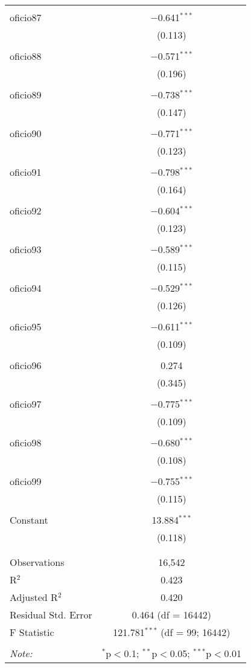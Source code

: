 \begin{table}[!htbp]
\begin{tabular}{@{\extracolsep{5pt}}lc}
  & \\ 
 oficio87 & $-$0.641$^{***}$ \\ 
  & (0.113) \\ 
  & \\ 
 oficio88 & $-$0.571$^{***}$ \\ 
  & (0.196) \\ 
  & \\ 
 oficio89 & $-$0.738$^{***}$ \\ 
  & (0.147) \\ 
  & \\ 
 oficio90 & $-$0.771$^{***}$ \\ 
  & (0.123) \\ 
  & \\ 
 oficio91 & $-$0.798$^{***}$ \\ 
  & (0.164) \\ 
  & \\ 
 oficio92 & $-$0.604$^{***}$ \\ 
  & (0.123) \\ 
  & \\ 
 oficio93 & $-$0.589$^{***}$ \\ 
  & (0.115) \\ 
  & \\ 
 oficio94 & $-$0.529$^{***}$ \\ 
  & (0.126) \\ 
  & \\ 
 oficio95 & $-$0.611$^{***}$ \\ 
  & (0.109) \\ 
  & \\ 
 oficio96 & 0.274 \\ 
  & (0.345) \\ 
  & \\ 
 oficio97 & $-$0.775$^{***}$ \\ 
  & (0.109) \\ 
  & \\ 
 oficio98 & $-$0.680$^{***}$ \\ 
  & (0.108) \\ 
  & \\ 
 oficio99 & $-$0.755$^{***}$ \\ 
  & (0.115) \\ 
  & \\ 
 Constant & 13.884$^{***}$ \\ 
  & (0.118) \\ 
  & \\ 
\hline \\[-1.8ex] 
Observations & 16,542 \\ 
R$^{2}$ & 0.423 \\ 
Adjusted R$^{2}$ & 0.420 \\ 
Residual Std. Error & 0.464 (df = 16442) \\ 
F Statistic & 121.781$^{***}$ (df = 99; 16442) \\ 
\hline 
\hline \\[-1.8ex] 
\textit{Note:}  & \multicolumn{1}{r}{$^{*}$p$<$0.1; $^{**}$p$<$0.05; $^{***}$p$<$0.01} \\ 
\end{tabular} 
\end{table} 
